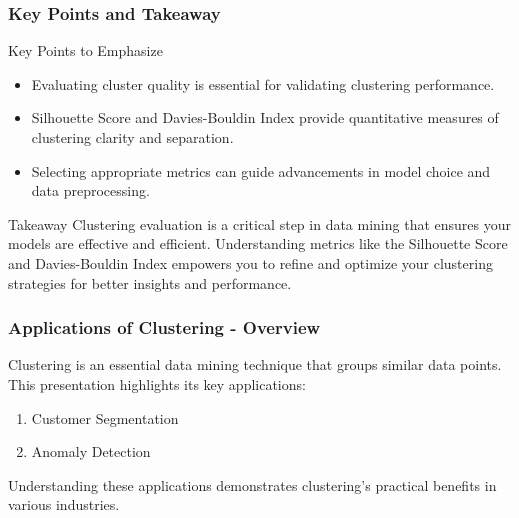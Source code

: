 \documentclass[aspectratio=169]{beamer}
\begin{document}
\begin{frame}[fragile]
    \frametitle{Key Points and Takeaway}
    \begin{block}{Key Points to Emphasize}
        \begin{itemize}
            \item Evaluating cluster quality is essential for validating clustering performance.
            \item Silhouette Score and Davies-Bouldin Index provide quantitative measures of clustering clarity and separation.
            \item Selecting appropriate metrics can guide advancements in model choice and data preprocessing.
        \end{itemize}
    \end{block}

    \begin{block}{Takeaway}
        Clustering evaluation is a critical step in data mining that ensures your models are effective and efficient. Understanding metrics like the Silhouette Score and Davies-Bouldin Index empowers you to refine and optimize your clustering strategies for better insights and performance.
    \end{block}
\end{frame}

\begin{frame}[fragile]
    \frametitle{Applications of Clustering - Overview}
    Clustering is an essential data mining technique that groups similar data points. This presentation highlights its key applications:
    \begin{enumerate}
        \item Customer Segmentation
        \item Anomaly Detection
    \end{enumerate}
    Understanding these applications demonstrates clustering's practical benefits in various industries.
\end{frame}
\end{document}
